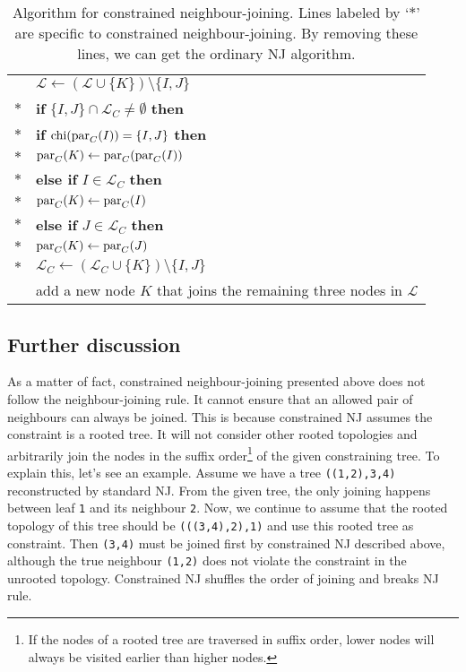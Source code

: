 \begin{table}[!hb]
\begin{center}
\begin{tabular}{|ll|}
&\lhspace\lhspace$\mathcal{L}\gets\left(\mathcal{L}\cup\{K\}\right)\setminus\{I,J\}$ \\
$\ast$&\lhspace\lhspace\textbf{if} $\{I,J\}\cap\mathcal{L}_C\neq\emptyset$ \textbf{then} \\
$\ast$&\lhspace\lhspace\lhspace\textbf{if} $\mathrm{chi}(\mathrm{par}_C(I))=\{I,J\}$ \textbf{then} \\
$\ast$&\lhspace\lhspace\lhspace\lhspace$\mathrm{par}_C(K)\gets\mathrm{par}_C(\mathrm{par}_C(I))$ \\
$\ast$&\lhspace\lhspace\lhspace\textbf{else if} $I\in\mathcal{L}_C$ \textbf{then}\\
$\ast$&\lhspace\lhspace\lhspace\lhspace$\mathrm{par}_C(K)\gets\mathrm{par}_C(I)$ \\
$\ast$&\lhspace\lhspace\lhspace\textbf{else if} $J\in\mathcal{L}_C$ \textbf{then}\\
$\ast$&\lhspace\lhspace\lhspace\lhspace$\mathrm{par}_C(K)\gets\mathrm{par}_C(J)$ \\
$\ast$&\lhspace\lhspace\lhspace$\mathcal{L}_C\gets\left(\mathcal{L}_C\cup\{K\}\right)\setminus\{I,J\}$ \\
&\lhspace add a new node $K$ that joins the remaining three nodes in $\mathcal{L}$ \\
\hline
\end{tabular}
\caption[Algorithm for constrained neighbour-joining]
{Algorithm for constrained neighbour-joining. Lines labeled by `$\ast$' are specific to
constrained neighbour-joining. By removing these lines, we can get the ordinary NJ algorithm.}\label{tab:cnj}
\end{center}
\end{table}

\subsection{Further discussion}
As a matter of fact, constrained neighbour-joining presented above does not follow the neighbour-joining rule.
It cannot ensure that an allowed pair of neighbours can always be joined. This is because constrained NJ
assumes the constraint is a rooted tree. It will not consider other rooted topologies and
arbitrarily join the nodes in the suffix order\footnote{If the nodes of a rooted tree are traversed in suffix order,
lower nodes will always be visited earlier than higher nodes.}
of the given constraining tree.
 To explain this, let's see an example. Assume we have a tree
{\tt ((1,2),3,4)} reconstructed by standard NJ. From the given tree, the only joining happens
between leaf {\tt 1} and its neighbour {\tt 2}. Now, we continue to assume that the
rooted topology of this tree should be {\tt (((3,4),2),1)} and use this rooted
tree as constraint. Then {\tt (3,4)} must be joined first by constrained NJ described above, although
the true neighbour {\tt (1,2)} does not violate the constraint in the unrooted topology.
Constrained NJ shuffles the order of joining and breaks NJ rule.

